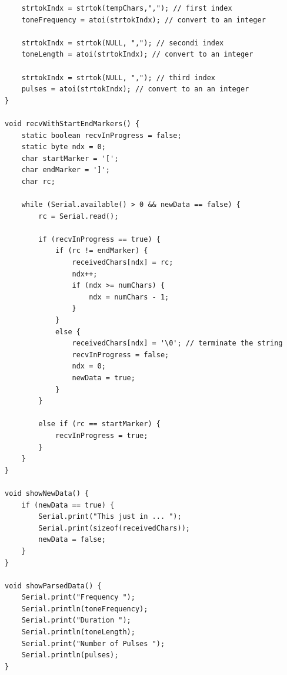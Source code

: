 \documentclass[12pt, a4paper]{article}
\begin{document}
\begin{lstlisting}
	strtokIndx = strtok(tempChars,","); // first index
	toneFrequency = atoi(strtokIndx); // convert to an integer
	
	strtokIndx = strtok(NULL, ","); // secondi index
	toneLength = atoi(strtokIndx); // convert to an integer
	
	strtokIndx = strtok(NULL, ","); // third index
	pulses = atoi(strtokIndx); // convert to an an integer
}

void recvWithStartEndMarkers() {
	static boolean recvInProgress = false;
	static byte ndx = 0;
	char startMarker = '[';
	char endMarker = ']';
	char rc;
	
	while (Serial.available() > 0 && newData == false) {
		rc = Serial.read();
		
		if (recvInProgress == true) {
			if (rc != endMarker) {
				receivedChars[ndx] = rc;
				ndx++;
				if (ndx >= numChars) {
					ndx = numChars - 1;
				}
			}
			else {
				receivedChars[ndx] = '\0'; // terminate the string
				recvInProgress = false;
				ndx = 0;
				newData = true;
			}
		}
		
		else if (rc == startMarker) {
			recvInProgress = true;
		}
	}
}

void showNewData() {
	if (newData == true) {
		Serial.print("This just in ... ");
		Serial.print(sizeof(receivedChars));
		newData = false;
	}
}

void showParsedData() {
	Serial.print("Frequency ");
	Serial.println(toneFrequency);
	Serial.print("Duration ");
	Serial.println(toneLength);
	Serial.print("Number of Pulses ");
	Serial.println(pulses);
}
\end{lstlisting}
\end{document}
